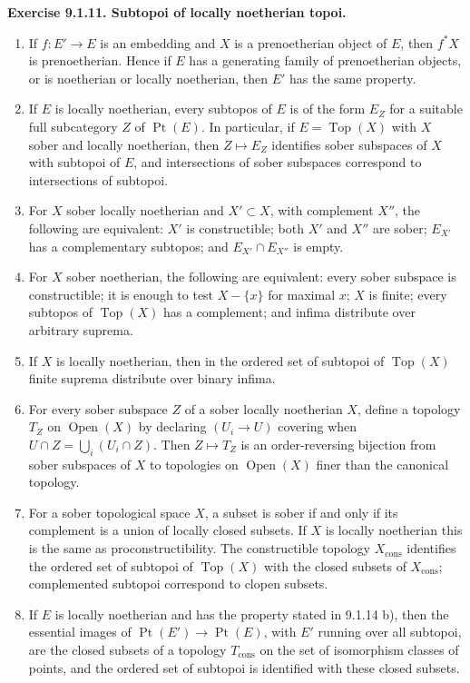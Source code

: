 \documentclass[11pt]{article}
\newcommand{\Top}{\operatorname{Top}}
\newcommand{\Ouv}{\operatorname{Open}}
\newcommand{\Ppoint}{\operatorname{Pt}}
\newcommand{\cons}{\mathrm{cons}}
\newenvironment{remarktext}[1]{\par\medskip\noindent\textbf{#1.}\ }{\par\medskip}
\begin{document}
\begin{remarktext}{Exercise 9.1.11. Subtopoi of locally noetherian topoi}
\begin{enumerate}[label=\alph*)]
\item If \(f:E'\to E\) is an embedding and \(X\) is a prenoetherian object of \(E\), then \(f^*X\) is prenoetherian. Hence if \(E\) has a generating family of prenoetherian objects, or is noetherian or locally noetherian, then \(E'\) has the same property.
\item If \(E\) is locally noetherian, every subtopos of \(E\) is of the form \(E_Z\) for a suitable full subcategory \(Z\) of \(\Ppoint(E)\). In particular, if \(E=\Top(X)\) with \(X\) sober and locally noetherian, then \(Z\mapsto E_Z\) identifies sober subspaces of \(X\) with subtopoi of \(E\), and intersections of sober subspaces correspond to intersections of subtopoi.
\item For \(X\) sober locally noetherian and \(X'\subset X\), with complement \(X''\), the following are equivalent: \(X'\) is constructible; both \(X'\) and \(X''\) are sober; \(E_{X'}\) has a complementary subtopos; and \(E_{X'}\cap E_{X''}\) is empty.
\item For \(X\) sober noetherian, the following are equivalent: every sober subspace is constructible; it is enough to test \(X-\{x\}\) for maximal \(x\); \(X\) is finite; every subtopos of \(\Top(X)\) has a complement; and infima distribute over arbitrary suprema.
\item If \(X\) is locally noetherian, then in the ordered set of subtopoi of \(\Top(X)\) finite suprema distribute over binary infima.
\item For every sober subspace \(Z\) of a sober locally noetherian \(X\), define a topology \(T_Z\) on \(\Ouv(X)\) by declaring \((U_i\to U)\) covering when \(U\cap Z=\bigcup_i(U_i\cap Z)\). Then \(Z\mapsto T_Z\) is an order-reversing bijection from sober subspaces of \(X\) to topologies on \(\Ouv(X)\) finer than the canonical topology.
\item For a sober topological space \(X\), a subset is sober if and only if its complement is a union of locally closed subsets. If \(X\) is locally noetherian this is the same as proconstructibility. The constructible topology \(X_{\cons}\) identifies the ordered set of subtopoi of \(\Top(X)\) with the closed subsets of \(X_{\cons}\); complemented subtopoi correspond to clopen subsets.
\item If \(E\) is locally noetherian and has the property stated in 9.1.14 b), then the essential images of \(\Ppoint(E')\to\Ppoint(E)\), with \(E'\) running over all subtopoi, are the closed subsets of a topology \(T_{\cons}\) on the set of isomorphism classes of points, and the ordered set of subtopoi is identified with these closed subsets.
\end{enumerate}
\end{remarktext}
\end{document}
